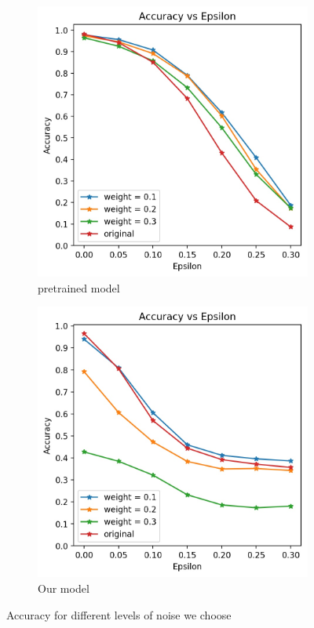 \begin{figure}[h!]
	\centering
	\begin{subfigure}{.4\textwidth}
		\includegraphics[width=\textwidth]{pretrained_Accuracy_vs_Epsilon_tv.jpg}
		\caption{pretrained model}
		\label{fig: tv pre}
	\end{subfigure}
	\begin{subfigure}{.4\textwidth}
		\includegraphics[width=\textwidth]{Accuracy_vs_Epsilon_tv.jpg}
		\caption{Our model}
		\label{fig: tv us}
	\end{subfigure}
	\caption{Accuracy for different levels of noise we choose}
\end{figure}

